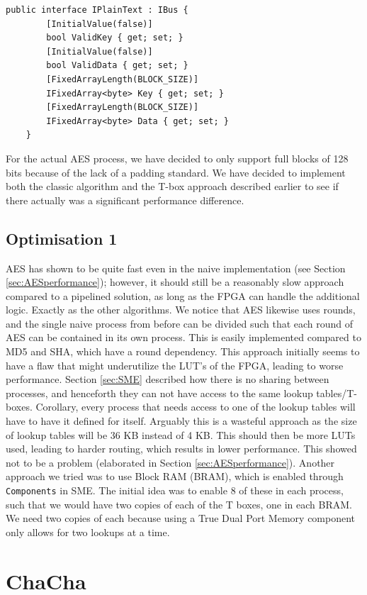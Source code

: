 \documentclass[a4paper, openany]{book}
\begin{document}
\begin{Verbatim}[fontsize=\footnotesize]
    public interface IPlainText : IBus {
        [InitialValue(false)]
        bool ValidKey { get; set; }
        [InitialValue(false)]
        bool ValidData { get; set; }
        [FixedArrayLength(BLOCK_SIZE)]
        IFixedArray<byte> Key { get; set; }
        [FixedArrayLength(BLOCK_SIZE)]
        IFixedArray<byte> Data { get; set; }
    }
\end{Verbatim}
For the actual AES process, we have decided to only support full blocks of 128 bits because of the lack of a padding standard. We have decided to implement both the classic algorithm and the T-box approach described earlier to see if there actually was a significant performance difference.

\subsection{Optimisation 1}
\label{AESopt}
AES has shown to be quite fast even in the naive implementation (see Section \ref{sec:AESperformance}); however, it should still be a reasonably slow approach compared to a pipelined solution, as long as the FPGA can handle the additional logic. Exactly as the other algorithms. We notice that AES likewise uses rounds, and the single naive process from before can be divided such that each round of AES can be contained in its own process. This is easily implemented compared to MD5 and SHA, which have a round dependency. This approach initially seems to have a flaw that might underutilize the LUT's of the FPGA, leading to worse performance. Section \ref{sec:SME} described how there is no sharing between processes, and henceforth they can not have access to the same lookup tables/T-boxes. Corollary, every process that needs access to one of the lookup tables will have to have it defined for itself. Arguably this is a wasteful approach as the size of lookup tables will be 36 KB instead of 4 KB. This should then be more LUTs used, leading to harder routing, which results in lower performance. This showed not to be a problem (elaborated in Section \ref{sec:AESperformance}). Another approach we tried was to use Block RAM (BRAM), which is enabled through \texttt{Components} in SME. The initial idea was to enable 8 of these in each process, such that we would have two copies of each of the T boxes, one in each BRAM. We need two copies of each because using a True Dual Port Memory component only allows for two lookups at a time.
\section{ChaCha}
\label{sec:org652e548}
\end{document}
